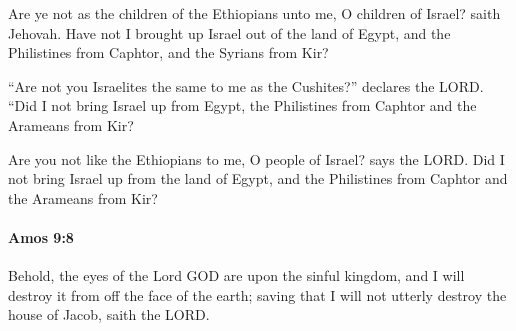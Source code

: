 			\begin{versebox}
					\item[BHS] 
					\item[LXX] 
					\item[ASV] Are ye not as the children of the Ethiopians unto me, O children of Israel? saith Jehovah. Have not I brought up Israel out of the land of Egypt, and the Philistines from Caphtor, and the Syrians from Kir?
					\item[NIV] “Are not you Israelites the same to me as the Cushites?” declares the LORD. “Did I not bring Israel up from Egypt, the Philistines from Caphtor and the Arameans from Kir?
					\item[NRSV] Are you not like the Ethiopians to me, O people of Israel? says the LORD. Did I not bring Israel up from the land of Egypt, and the Philistines from Caphtor and the Arameans from Kir?
			\end{versebox}

		\paragraph{Amos 9:8} %
			\label{AMOS-9-8}

			Behold, the eyes of the Lord GOD are upon the sinful kingdom, and I will destroy it from off the face of the earth; saving that I will not utterly destroy the house of Jacob, saith the LORD.

